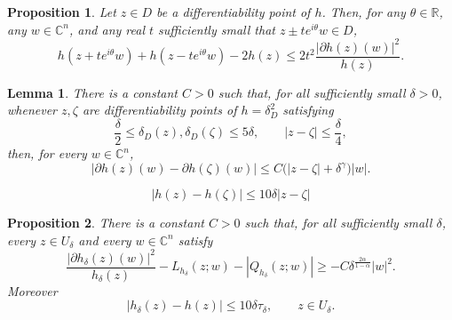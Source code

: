 \documentclass[10pt,a4paper]{amsart}
\newtheorem{proposition}{Proposition}
\newtheorem{lemma}{Lemma}
\newcommand{\C}{\mathbb C}
\begin{document}
\begin{proposition}\label{prop:second-difference}
Let $z\in D$ be a differentiability point of $h$. Then, for any
$\theta\in\mathbb R$, any $w\in\C^n$, and any real $t$ sufficiently small
that $z\pm te^{i\theta}w\in D$,
\begin{equation}\label{eq:second-difference}
 h(z+t e^{i\theta}w)+h(z-t e^{i\theta}w)-2h(z)
 \le 2t^2\frac{|\partial h(z)(w)|^2}{h(z)}.
\end{equation}
\end{proposition}

\begin{lemma}\label{lem:gradosc}
There is a constant $C>0$ such that, for all sufficiently small $\delta>0$,
whenever $z,\zeta$ are differentiability points of $h=\delta_D^2$ satisfying
\[
 \frac\delta2\le\delta_D(z),\delta_D(\zeta)\le5\delta,
 \qquad |z-\zeta|\le\frac\delta4,
\]
then, for every $w\in\C^n$,
\begin{equation}\label{eq:gradestimate}
 |\partial h(z)(w)-\partial h(\zeta)(w)|
 \le C\bigl(|z-\zeta|+\delta^\gamma\bigr)|w|.
\end{equation}
\end{lemma}

\begin{equation}\label{eq:hosc}
 |h(z)-h(\zeta)|\le10\delta|z-\zeta|
\end{equation}

\begin{proposition}\label{prop:mollification}
There is a constant $C>0$ such that, for all sufficiently small $\delta$,
every $z\in U_\delta$ and every $w\in\C^n$ satisfy
\begin{equation}\label{eq:mollifiedineq}
 \frac{|\partial h_\delta(z)(w)|^2}{h_\delta(z)}
 -L_{h_\delta}(z;w)-|Q_{h_\delta}(z;w)|
 \ge -C\delta^{\frac{2\alpha}{1-\alpha}}|w|^2.
\end{equation}
Moreover
\begin{equation}\label{eq:C0approx}
 |h_\delta(z)-h(z)|\le10\delta\tau_\delta,
 \qquad z\in U_\delta.
\end{equation}
\end{proposition}
\end{document}
